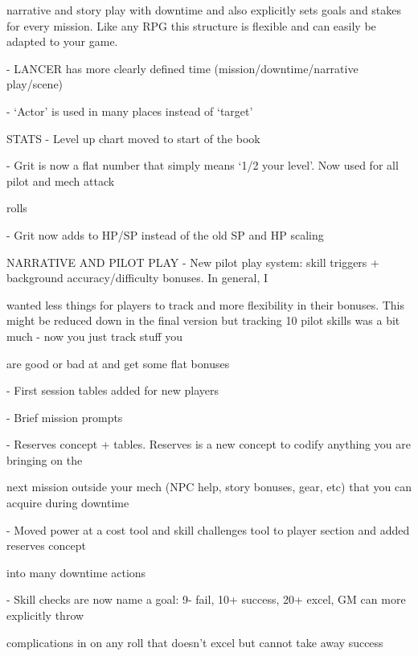         narrative and story play with downtime and also explicitly sets goals and stakes for every mission.  
         Like any RPG this structure is flexible and can easily be adapted to your game.
 
     -   LANCER has more clearly defined time (mission/downtime/narrative play/scene)
 
     -   ‘Actor’ is used in many places instead of ‘target’  

STATS  
     -   Level up chart moved to start of the book
 
     -   Grit is now a flat number that simply means ‘1/2 your level’. Now used for all pilot and mech attack  

         rolls
 

                                                                                                                         


    -    Grit now adds to HP/SP instead of the old SP and HP scaling
 

NARRATIVE AND PILOT PLAY  
    -    New pilot play system: skill triggers + background accuracy/difficulty bonuses. In general, I  

         wanted less things for players to track and more flexibility in their bonuses. This might be reduced  
         down in the final version but tracking 10 pilot skills was a bit much - now you just track stuff you  

         are good or bad at and get some flat bonuses
 
    -    First session tables added for new players
 

    -    Brief mission prompts
 
    -    Reserves concept + tables. Reserves is a new concept to codify anything you are bringing on the  

         next mission outside your mech (NPC help, story bonuses, gear, etc) that you can acquire during  
         downtime
 
    -    Moved power at a cost tool and skill challenges tool to player section and added reserves concept  

         into many downtime actions
 
    -    Skill checks are now name a goal: 9- fail, 10+ success, 20+ excel, GM can more explicitly throw  

         complications in on any roll that doesn’t excel but cannot take away success
 


